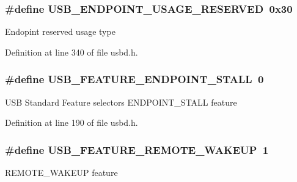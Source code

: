 \subsubsection[{\texorpdfstring{U\+S\+B\+\_\+\+E\+N\+D\+P\+O\+I\+N\+T\+\_\+\+U\+S\+A\+G\+E\+\_\+\+R\+E\+S\+E\+R\+V\+ED}{USB_ENDPOINT_USAGE_RESERVED}}]{\setlength{\rightskip}{0pt plus 5cm}\#define U\+S\+B\+\_\+\+E\+N\+D\+P\+O\+I\+N\+T\+\_\+\+U\+S\+A\+G\+E\+\_\+\+R\+E\+S\+E\+R\+V\+ED~0x30}\hypertarget{group__USBD__Core_ga0ee1319e7242bb61298af850ea64f08a}{}\label{group__USBD__Core_ga0ee1319e7242bb61298af850ea64f08a}
Endopint reserved usage type 

Definition at line 340 of file usbd.\+h.

\subsubsection[{\texorpdfstring{U\+S\+B\+\_\+\+F\+E\+A\+T\+U\+R\+E\+\_\+\+E\+N\+D\+P\+O\+I\+N\+T\+\_\+\+S\+T\+A\+LL}{USB_FEATURE_ENDPOINT_STALL}}]{\setlength{\rightskip}{0pt plus 5cm}\#define U\+S\+B\+\_\+\+F\+E\+A\+T\+U\+R\+E\+\_\+\+E\+N\+D\+P\+O\+I\+N\+T\+\_\+\+S\+T\+A\+LL~0}\hypertarget{group__USBD__Core_ga3ff0518fb298c9c9b556f59c0468ec0d}{}\label{group__USBD__Core_ga3ff0518fb298c9c9b556f59c0468ec0d}
U\+SB Standard Feature selectors E\+N\+D\+P\+O\+I\+N\+T\+\_\+\+S\+T\+A\+LL feature 

Definition at line 190 of file usbd.\+h.

\subsubsection[{\texorpdfstring{U\+S\+B\+\_\+\+F\+E\+A\+T\+U\+R\+E\+\_\+\+R\+E\+M\+O\+T\+E\+\_\+\+W\+A\+K\+E\+UP}{USB_FEATURE_REMOTE_WAKEUP}}]{\setlength{\rightskip}{0pt plus 5cm}\#define U\+S\+B\+\_\+\+F\+E\+A\+T\+U\+R\+E\+\_\+\+R\+E\+M\+O\+T\+E\+\_\+\+W\+A\+K\+E\+UP~1}\hypertarget{group__USBD__Core_ga2185a0541f4155470596c9c739c1656b}{}\label{group__USBD__Core_ga2185a0541f4155470596c9c739c1656b}
R\+E\+M\+O\+T\+E\+\_\+\+W\+A\+K\+E\+UP feature 

